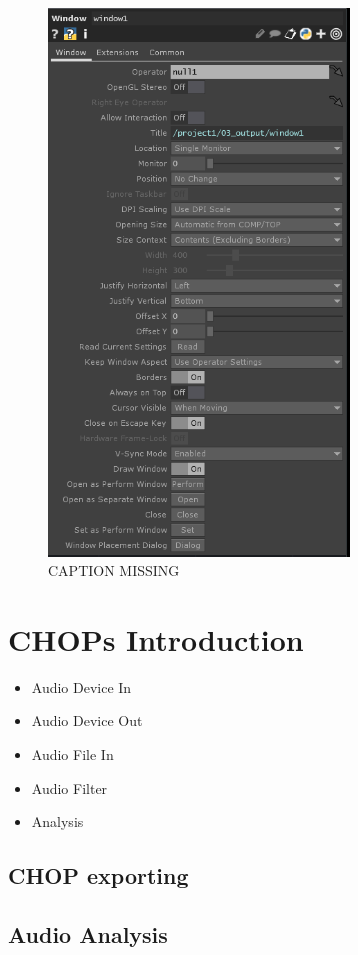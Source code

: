 \begin{figure}[H]
	\centering
	\includegraphics[width=8cm]{img/windowCompPars.PNG}
	\caption[shortCaption]
	{CAPTION MISSING}
	\label{fig:label}
\end{figure}


\section{CHOPs Introduction}
\begin{itemize}
\item Audio Device In \CHOP
\item Audio Device Out \CHOP
\item Audio File In \CHOP
\item Audio Filter \CHOP
\item Analysis \CHOP
\end{itemize}

\subsection{CHOP exporting}


\subsection{Audio Analysis}

